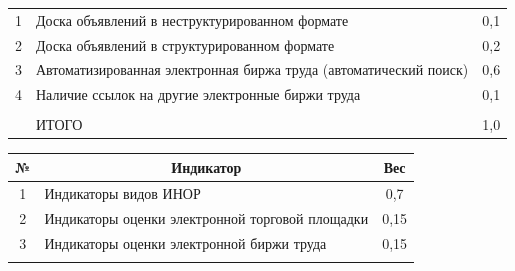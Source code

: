 \begin{itemize}
\begin{table}
\begin{center}
\begin{tabular}{|c|l|c|}
1&Доска объявлений в неструктурированном формате&0,1\\


2&Доска объявлений в структурированном формате&0,2\\


3&Автоматизированная электронная биржа труда (автоматический поиск)&0,6\\


4&Наличие ссылок на другие электронные биржи труда&0,1\\


\hline


&&\\[-10pt]


&ИТОГО&1,0\\


\hline


\end{tabular}


\end{center}






\vspace*{-12pt}


\begin{center}




\vspace*{2ex}





\tabcolsep=18pt


\begin{tabular}{|c|l|c|}


\hline


№&\multicolumn{1}{c|}{Индикатор}&Вес\\


\hline


1&Индикаторы видов ИНОР&0,7\hphantom{9}\\


2&Индикаторы оценки электронной торговой площадки&0,15\\


3&Индикаторы оценки электронной биржи труда&0,15\\


\hline


&&\\[-10pt]



\end{tabular}
\end{center}
\end{table}
\end{itemize}
